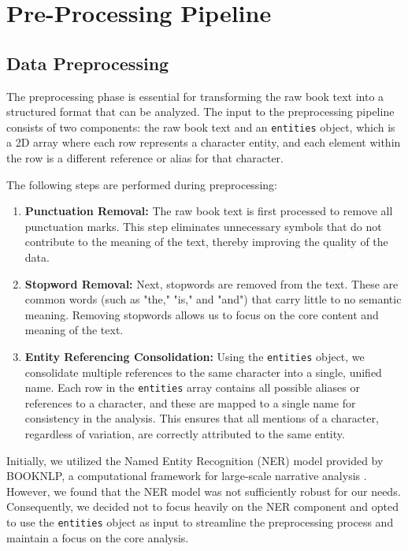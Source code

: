 \documentclass[a4paper,12pt]{report}
\begin{document}
\section{Pre-Processing Pipeline}
\label{pre-process}
\subsection{Data Preprocessing}

The preprocessing phase is essential for transforming the raw book text into a structured format that can be analyzed. The input to the preprocessing pipeline consists of two components: the raw book text and an \texttt{entities} object, which is a 2D array where each row represents a character entity, and each element within the row is a different reference or alias for that character.

The following steps are performed during preprocessing:

\begin{enumerate}
    \item \textbf{Punctuation Removal:} The raw book text is first processed to remove all punctuation marks. This step eliminates unnecessary symbols that do not contribute to the meaning of the text, thereby improving the quality of the data.

    \item \textbf{Stopword Removal:} Next, stopwords are removed from the text. These are common words (such as "the," "is," and "and") that carry little to no semantic meaning. Removing stopwords allows us to focus on the core content and meaning of the text.

    \item \textbf{Entity Referencing Consolidation:} Using the \texttt{entities} object, we consolidate multiple references to the same character into a single, unified name. Each row in the \texttt{entities} array contains all possible aliases or references to a character, and these are mapped to a single name for consistency in the analysis. This ensures that all mentions of a character, regardless of variation, are correctly attributed to the same entity.
\end{enumerate}

Initially, we utilized the Named Entity Recognition (NER) model provided by BOOKNLP, a computational framework for large-scale narrative analysis \cite{BAMMAN}. However, we found that the NER model was not sufficiently robust for our needs. Consequently, we decided not to focus heavily on the NER component and opted to use the \texttt{entities} object as input to streamline the preprocessing process and maintain a focus on the core analysis.
\end{document}
